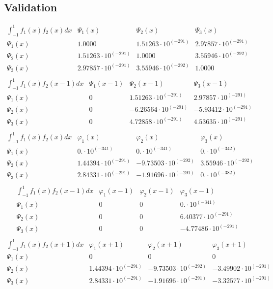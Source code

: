 \documentclass{article}
\begin{document}
 \begin{landscape}
 \subsection{Validation}$$ \begin{array}{l|lll}
\int_{-1}^1 f_1(x)f_2(x) dx& \Psi_1(x)& \Psi_2(x)& \Psi_3(x) \\ \hline 
 \Psi_1(x) & 1.0000 & 1.51263\cdot 10^{(-291)} & 2.97857\cdot 10^{(-291)} \\ 
\Psi_2(x) & 1.51263\cdot 10^{(-291)} & 1.0000 & 3.55946\cdot 10^{(-292)} \\ 
\Psi_3(x) & 2.97857\cdot 10^{(-291)} & 3.55946\cdot 10^{(-292)} & 1.0000 \\ 
\end{array} $$
$$ \begin{array}{l|lll}
\int_{-1}^1 f_1(x)f_2(x-1) dx& \Psi_1(x-1)& \Psi_2(x-1)& \Psi_3(x-1) \\ \hline 
 \Psi_1(x) & 0 & 1.51263\cdot 10^{(-291)} & 2.97857\cdot 10^{(-291)} \\ 
\Psi_2(x) & 0 & -6.26564\cdot 10^{(-291)} & -5.93412\cdot 10^{(-291)} \\ 
\Psi_3(x) & 0 & 4.72858\cdot 10^{(-291)} & 4.53635\cdot 10^{(-291)} \\ 
\end{array} $$ 
$$ \begin{array}{l|lll}
\int_{-1}^1 f_1(x)f_2(x) dx& \varphi_1(x)& \varphi_2(x)& \varphi_3(x) \\ \hline 
 \Psi_1(x) & 0.\cdot 10^{(-341)} & 0.\cdot 10^{(-341)} & 0.\cdot 10^{(-342)} \\ 
\Psi_2(x) & 1.44394\cdot 10^{(-291)} & -9.73503\cdot 10^{(-292)} & 3.55946\cdot 10^{(-292)} \\ 
\Psi_3(x) & 2.84331\cdot 10^{(-291)} & -1.91696\cdot 10^{(-291)} & 0.\cdot 10^{(-382)} \\ 
\end{array} $$ 
$$ \begin{array}{l|lll}
\int_{-1}^1 f_1(x)f_2(x-1) dx& \varphi_1(x-1)& \varphi_2(x-1)& \varphi_3(x-1) \\ \hline 
 \Psi_1(x) & 0 & 0 & 0.\cdot 10^{(-341)} \\ 
\Psi_2(x) & 0 & 0 & 6.40377\cdot 10^{(-291)} \\ 
\Psi_3(x) & 0 & 0 & -4.77486\cdot 10^{(-291)} \\ 
\end{array} $$ 
$$ \begin{array}{l|lll}
\int_{-1}^1 f_1(x)f_2(x+1) dx& \varphi_1(x+1)& \varphi_2(x+1)& \varphi_3(x+1) \\ \hline 
 \Psi_1(x) & 0 & 0 & 0 \\ 
\Psi_2(x) & 1.44394\cdot 10^{(-291)} & -9.73503\cdot 10^{(-292)} & -3.49902\cdot 10^{(-291)} \\ 
\Psi_3(x) & 2.84331\cdot 10^{(-291)} & -1.91696\cdot 10^{(-291)} & -3.32577\cdot 10^{(-291)} \\ 
\end{array} $$ 
\end{landscape} 
\end{document}
